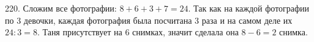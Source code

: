 220. Сложим все фотографии: $8+6+3+7=24.$ Так как на каждой фотографии по 3 девочки, каждая фотография была посчитана 3 раза и на самом деле их $24:3=8.$ Таня присутствует на 6 снимках, значит сделала она $8-6=2$ снимка.\\
